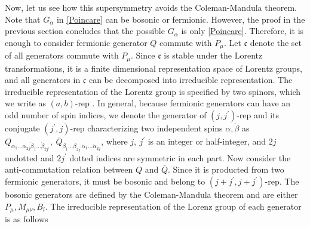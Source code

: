 \documentclass[a4paper,12pt]{article}
\def\ua{\alpha}
\def\da{\dot{\alpha}}
\def\ub{\beta}
\def\db{\dot{\beta}}
\theoremstyle{plain}
\theoremstyle{definition}
\begin{document}
Now, let us see how this supersymmetry avoids the Coleman-Mandula theorem.
Note that $G_\alpha$ in \eqref{Poincare} can be bosonic or fermionic. 
However, the proof in the previous section concludes that the possible $G_\alpha$ is only \eqref{Poincare}.
Therefore, it is enough to consider fermionic generator $Q$ commute with $P_\mu$. 
Let $\mathfrak{c}$ denote the set of all generators commute with $P_\mu$.
Since $\mathfrak{c}$ is stable under the Lorentz transformations, it is a finite dimensional representation space of Lorentz groups, and all generators in $\mathfrak{c}$ can be decomposed into irreducible representation.
The irreducible representation of the Lorentz group is specified by two spinors, which we write as $(a,b)$-rep .
In general, because fermionic generators can have an odd number of spin indices, we denote the generator of  $(j,j^\prime)$-rep  and its conjugate $(j^\prime,j)$-rep  characterizing two independent spins $\ua,\db$ as $Q_{\ua_1\dots\ua_{2j}\db_1\dots\db_{2j'}}, \ \bar{Q}_{\ub_1\dots\ub_{2j^\prime}\da_1\dots\da_{2j}}$,
where $j,\ j^\prime$ is an integer or half-integer, and $2j$ undotted and $2j^\prime$ dotted indices are symmetric in each part.
Now consider the anti-commutation relation between $Q$ and $\bar{Q}$.
Since it is producted from two fermionic generators, it must be bosonic and belong to $(j+j^\prime, j+j^\prime)$-rep.
The bosonic generators are defined by the Coleman-Mandula theorem and are either $P_\mu,M_{\mu\nu},B_l$. The irreducible representation of the Lorenz group of each generator is as follows
\end{document}
